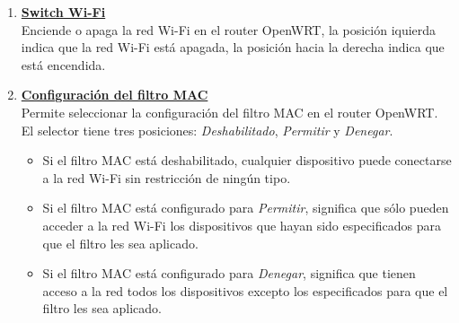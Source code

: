 \documentclass[12pt, twoside]{article}
\begin{document}
\begin{enumerate}
            \item \textbf{\underline{Switch Wi-Fi}} \\
            Enciende o apaga la red Wi-Fi en el router OpenWRT, la posición iquierda indica que la red Wi-Fi está apagada, la posición hacia la derecha indica que está encendida.

            \item \textbf{\underline{Configuración del filtro MAC}} \\
            Permite seleccionar la configuración del filtro MAC en el router OpenWRT. El selector tiene tres posiciones: \textit{Deshabilitado}, \textit{Permitir} y \textit{Denegar}.
            \begin{itemize}
                \item Si el filtro MAC está deshabilitado, cualquier dispositivo puede conectarse a la red Wi-Fi sin restricción de ningún tipo.
                \item Si el filtro MAC está configurado para \textit{Permitir}, significa que sólo pueden acceder a la red Wi-Fi los dispositivos que hayan sido especificados para que el filtro les sea aplicado.
                \item Si el filtro MAC está configurado para \textit{Denegar}, significa que tienen acceso a la red todos los dispositivos excepto los especificados para que el filtro les sea aplicado.
            \end{itemize}
            

\end{enumerate}
\end{document}
